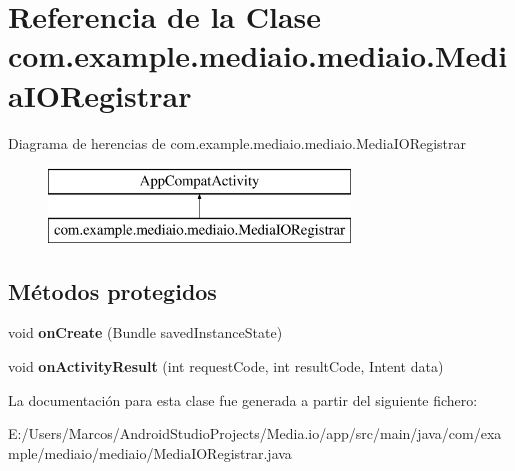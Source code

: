 \hypertarget{classcom_1_1example_1_1mediaio_1_1mediaio_1_1_media_i_o_registrar}{}\section{Referencia de la Clase com.\+example.\+mediaio.\+mediaio.\+Media\+I\+O\+Registrar}
\label{classcom_1_1example_1_1mediaio_1_1mediaio_1_1_media_i_o_registrar}
Diagrama de herencias de com.\+example.\+mediaio.\+mediaio.\+Media\+I\+O\+Registrar\begin{figure}[H]
\begin{center}
\leavevmode
\includegraphics[height=2.000000cm]{classcom_1_1example_1_1mediaio_1_1mediaio_1_1_media_i_o_registrar}
\end{center}
\end{figure}
\subsection*{Métodos protegidos}
\begin{DoxyCompactItemize}
\item 
\mbox{\label{classcom_1_1example_1_1mediaio_1_1mediaio_1_1_media_i_o_registrar_aeb92c6562f9938323bbafe38560fec8f}} 
void {\bfseries on\+Create} (Bundle saved\+Instance\+State)
\item 
\mbox{\label{classcom_1_1example_1_1mediaio_1_1mediaio_1_1_media_i_o_registrar_a99606f48de21b8998c340cb2120359b0}} 
void {\bfseries on\+Activity\+Result} (int request\+Code, int result\+Code, Intent data)
\end{DoxyCompactItemize}


La documentación para esta clase fue generada a partir del siguiente fichero\+:\begin{DoxyCompactItemize}
\item 
E\+:/\+Users/\+Marcos/\+Android\+Studio\+Projects/\+Media.\+io/app/src/main/java/com/example/mediaio/mediaio/Media\+I\+O\+Registrar.\+java\end{DoxyCompactItemize}
